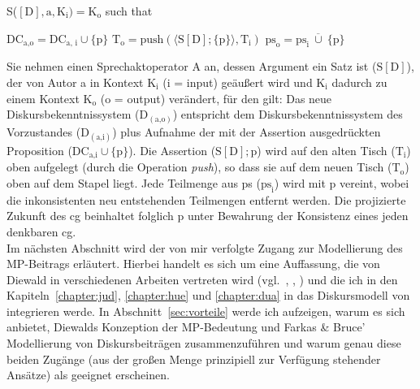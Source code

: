 \begin{exe}
	\ex\label{236} 
		S($[\textrm{D}], \textrm{a}, \textrm{K}_{\textrm{i}}) = \textrm{K}_{\textrm{o}}$ such that
		\begin{xlist}	
			\ex\label{236a} $\textrm{DC}_{\textrm{a,o}} = \textrm{DC}_{\textrm{a, i}} \cup \lbrace\textrm{p}\rbrace$
			\ex\label{236b} $\textrm{T}_{\textrm{o}} = \textrm{push}(\langle \textrm{S}[\textrm{D}]; \lbrace \textrm{p} \rbrace \rangle, \textrm{T}_{\textrm{i}})$
			\ex\label{236c} $\textrm{ps}_{\textrm{o}} = \textrm{ps}_{\textrm{i}} \ \overline\cup \ \lbrace \textrm{p} \rbrace$
			\hfill\hbox{\citet[92]{Farkas2010}}
		\end{xlist}
\end{exe}
Sie nehmen einen Sprechaktoperator A an, dessen Argument ein Satz ist ($\textrm{S}[\textrm{D}]$), der von Autor a in Kontext $\textrm{K}_{\textrm{i}}$ (i = input) geäußert wird und $\textrm{K}_{\textrm{i}}$ dadurch zu einem Kontext $\textrm{K}_{\textrm{o}}$ (o = output) verändert, für den gilt: Das neue Diskursbekenntnissystem ($\textrm{D}_{(\textrm{a,o})}$) entspricht dem Diskursbekenntnissystem des Vorzustandes ($\textrm{D}_{(\textrm{a,i})}$) plus Aufnahme der mit der Assertion ausgedrückten Proposition ($\textrm{DC}_{\textrm{a,i}} \cup \lbrace \textrm{p} \rbrace$). Die Assertion ($\textrm{S}[\textrm{D}]; \textrm{p}$) wird auf den alten Tisch ($\textrm{T}_{\textrm{i}}$) oben aufgelegt (durch die Operation \textit{push}), so dass sie auf dem neuen Tisch ($\textrm{T}_{\textrm{o}}$) oben auf dem Stapel liegt. Jede Teilmenge aus ps ($\textrm{ps}_{\textrm{i}}$) wird mit p vereint, wobei die inkonsistenten neu entstehenden Teilmengen entfernt werden. Die projizierte Zukunft des cg beinhaltet folglich p unter Bewahrung der Konsistenz eines jeden denkbaren cg.\\

\noindent
Im nächsten Abschnitt wird der von mir verfolgte Zugang zur Modellierung des MP-Beitrags erläutert. Hierbei handelt es sich um eine Auffassung, die von Diewald in verschiedenen Arbeiten vertreten wird (vgl.\ \citealt{Diewald1997, Diewald2006, Diewald2007}, \citealt{Diewald1998}, \citealt{Diewald2010}) und die ich in den Kapiteln~\ref{chapter:jud}, \ref{chapter:hue} und \ref{chapter:dua} in das Diskursmodell von \citet{Farkas2010} integrieren werde. In Abschnitt~\ref{sec:vorteile} werde ich aufzeigen, warum es sich anbietet, Diewalds Konzeption der MP-Bedeutung und Farkas \& Bruce'  Modellierung von Diskursbeiträgen zusammenzuführen und warum genau diese beiden Zugänge (aus der großen Menge prinzipiell zur Verfügung stehender Ansätze) als geeignet erscheinen.

